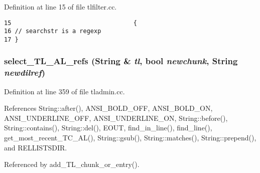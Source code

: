 Definition at line 15 of file tlfilter.cc.



\footnotesize\begin{verbatim}15                                  {
16 // searchstr is a regexp
17 }
\end{verbatim}\normalsize 
{}
\subsubsection{ select\_\-TL\_\-AL\_\-refs ({\bf String} \& {\em tl}, bool {\em newchunk}, {\bf String} {\em newdilref})}\label{dil2al_8hh_a324}




Definition at line 359 of file tladmin.cc.

References String::after(), ANSI\_\-BOLD\_\-OFF, ANSI\_\-BOLD\_\-ON, ANSI\_\-UNDERLINE\_\-OFF, ANSI\_\-UNDERLINE\_\-ON, String::before(), String::contains(), String::del(), EOUT, find\_\-in\_\-line(), find\_\-line(), get\_\-most\_\-recent\_\-TC\_\-AL(), String::gsub(), String::matches(), String::prepend(), and RELLISTSDIR.

Referenced by add\_\-TL\_\-chunk\_\-or\_\-entry().



